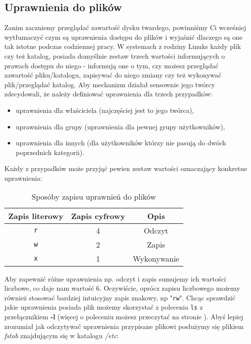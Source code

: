 \subsection{Uprawnienia do plików}
Zanim zaczniemy przeglądać zawartość dysku twardego, powinniśmy Ci wcześniej wytłumaczyć czym są uprawnienia dostępu do plików i wyjaśnić dlaczego są one tak istotne podczas codziennej pracy.
\newline
\newline
W systemach z rodziny Linuks każdy plik czy też katalog, posiada domyślnie zestaw trzech wartości informujących o prawach dostępu do niego - informują one o tym, czy możesz przeglądać zawartość pliku/katalogu, zapisywać do niego zmiany czy też wykonywać plik/przeglądać katalog. Aby mechanizm działał sensownie jego twórcy zdecydowali, że należy definiować uprawnienia dla trzech przypadków:
\begin{itemize}
\item uprawnienia dla właściciela (najczęściej jest to jego twórca),
\item uprawnienia dla grupy (uprawnienia dla pewnej grupy użytkowników),
\item uprawnienia dla innych (dla użytkowników którzy nie pasują do dwóch poprzednich kategorii).
\end{itemize}
Każdy z przypadków może przyjąć pewien zestaw wartości oznaczający konkretne uprawnienia:
\begin{table}[h!t]
\begin{center}
\begin{tabular}{|c|c|c|} \hline
Zapis literowy & Zapis cyfrowy & Opis \\ \hline
\texttt{r} & 4 & Odczyt \\ \hline
\texttt{w} & 2 & Zapis \\ \hline
\texttt{x} & 1 & Wykonywanie \\ \hline
\end{tabular}
\caption{Sposóby zapisu uprawnień do plików}
\label{tab:uprawnienia}
\end{center}
\end{table}
\newline
Aby zapewnić różne uprawnienia np. odczyt i zapis sumujemy ich wartości liczbowe, co daje nam wartość 6. Oczywiście, oprócz zapisu liczbowego możemy również stosować bardziej intuicyjny zapis znakowy, np "\texttt{rw}". Chcąc sprawdzić jakie uprawnienia posiada plik możemy skorzystać z polecenia \texttt{ls} z przełącznikiem \textbf{-l} (więcej o poleceniu możesz przeczytać na stronie \pageref{sec:ls}). Abyś lepiej zrozumiał jak odczytywać uprawnienia przypisane plikowi posłużymy się plikiem \textit{fstab} znajdującym się w katalogu \textit{/etc}:
